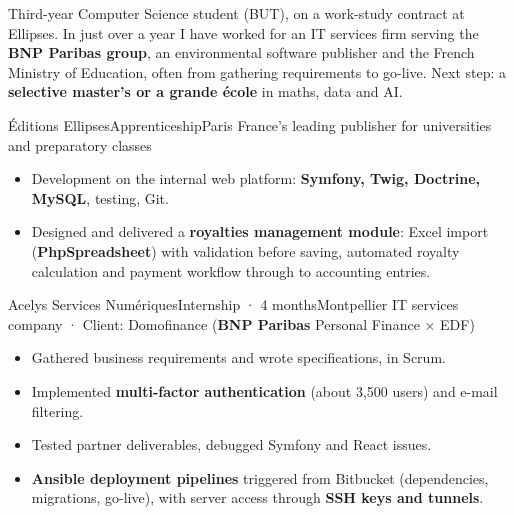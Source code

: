 \def\cvenglish{}



\makeheader

\begin{minipage}[t]{\mainwidth}
\raggedright

Third-year Computer Science student (BUT), on a work-study contract at Ellipses. In just over a year
I have worked for an IT services firm serving the \textbf{BNP Paribas group}, an environmental software
publisher and the French Ministry of Education, often from gathering requirements to go-live.
Next step: a \textbf{selective master's or a grande école} in maths, data and AI.
\keyfigures


  {Éditions Ellipses}{Apprenticeship}{Paris}
  {France's leading publisher for universities and preparatory classes}
\begin{itemize}
  \item Development on the internal web platform: \textbf{Symfony, Twig, Doctrine, MySQL}, testing, Git.
  \item Designed and delivered a \textbf{royalties management module}: Excel import (\textbf{PhpSpreadsheet}) with validation before saving, automated royalty calculation and payment workflow through to accounting entries.
\end{itemize}

  {Acelys Services Numériques}{Internship · 4 months}{Montpellier}
  {IT services company · Client: Domofinance (\textbf{\color{ink}BNP Paribas} Personal Finance × EDF)}
\begin{itemize}
  \item Gathered business requirements and wrote specifications, in Scrum.
  \item Implemented \textbf{multi-factor authentication} (about 3,500 users) and e-mail filtering.
  \item Tested partner deliverables, debugged Symfony and React issues.
  \item \textbf{Ansible deployment pipelines} triggered from Bitbucket (dependencies, migrations, go-live), with server access through \textbf{SSH keys and tunnels}.
\end{itemize}


\end{minipage}
